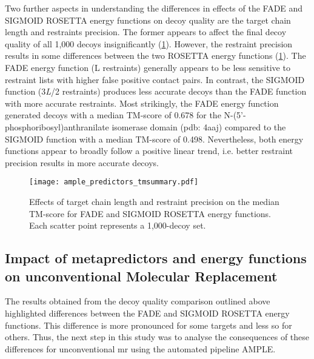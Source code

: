 Two further aspects in understanding the differences in effects of the FADE and SIGMOID ROSETTA energy functions on decoy quality are the target chain length and restraints precision. The former appears to affect the final decoy quality of all 1,000 decoys insignificantly (\cref{fig:ample_predictor_tmsummary}). However, the restraint precision results in some differences between the two ROSETTA energy functions (\cref{fig:ample_predictor_tmsummary}). The FADE energy function (L restraints) generally appears to be less sensitive to restraint lists with higher false positive contact pairs.  In contrast, the SIGMOID function  (3\textit{L}/2 restraints) produces less accurate decoys than the FADE function with more accurate restraints. Most strikingly, the FADE energy function generated decoys with a median TM-score of 0.678 for the N-(5'-phosphoribosyl)anthranilate isomerase domain (\gls{pdb}: 4aaj) compared to the SIGMOID function with a median TM-score of 0.498. Nevertheless, both energy functions appear to broadly follow a positive linear trend, i.e. better restraint precision results in more accurate decoys.

\begin{figure}[H]
    \centering
    \texttt{[image: ample\_predictors\_tmsummary.pdf]}
    \caption[Influence of target chain length and restraint precision on median TM-score]{Effects of target chain length and restraint precision on the median TM-score for FADE and SIGMOID ROSETTA energy functions. Each scatter point represents a 1,000-decoy set.}
    \label{fig:ample_predictor_tmsummary}
\end{figure}

\subsection{Impact of metapredictors and energy functions on unconventional Molecular Replacement}
The results obtained from the decoy quality comparison outlined above highlighted differences between the FADE and SIGMOID ROSETTA energy functions. This difference is more pronounced for some targets and less so for others. Thus, the next step in this study was to analyse the consequences  of these differences for unconventional \gls{mr} using the automated pipeline AMPLE.

